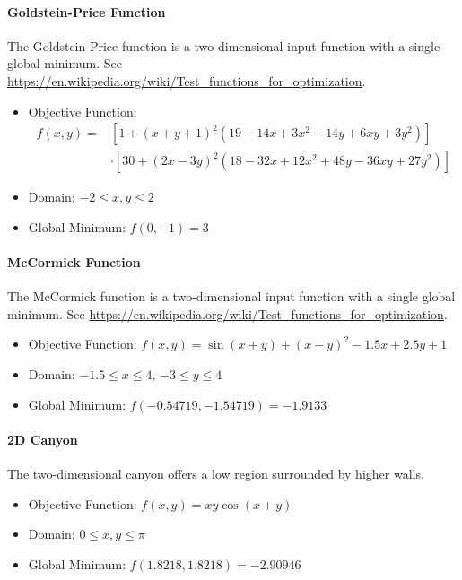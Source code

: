 \paragraph{Goldstein-Price Function}
The Goldstein-Price function is a two-dimensional input function with a single global minimum.
See \url{https://en.wikipedia.org/wiki/Test_functions_for_optimization}.

\begin{itemize}
  \item Objective Function:
    \begin{align}
      f(x,y) =& \left[1+(x+y+1)^2\left(19-14x+3x^2-14y+6xy+3y^2\right)\right] \\ \nonumber
        & \cdot\left[30+(2x-3y)^2(18-32x+12x^2+48y-36xy+27y^2)\right]
    \end{align}
  \item Domain: $-2 \leq x,y \leq 2$
  \item Global Minimum: $f(0,-1)=3$
\end{itemize}

\paragraph{McCormick Function}
The McCormick function is a two-dimensional input function with a single global minimum.
See \url{https://en.wikipedia.org/wiki/Test_functions_for_optimization}.

\begin{itemize}
  \item Objective Function: $f(x,y) = \sin(x+y) + (x-y)^2 - 1.5x + 2.5y + 1$
  \item Domain: $-1.5 \leq x \leq 4$, $-3 \leq y \leq 4$
  \item Global Minimum: $f(-0.54719,-1.54719) = -1.9133$
\end{itemize}

\paragraph{2D Canyon}
The two-dimensional canyon offers a low region surrounded by higher walls.

\begin{itemize}
  \item Objective Function: $f(x,y) = xy\cos(x+y)$
  \item Domain: $0 \leq x,y \leq \pi$
  \item Global Minimum: $f(1.8218,1.8218)=-2.90946$
\end{itemize}

